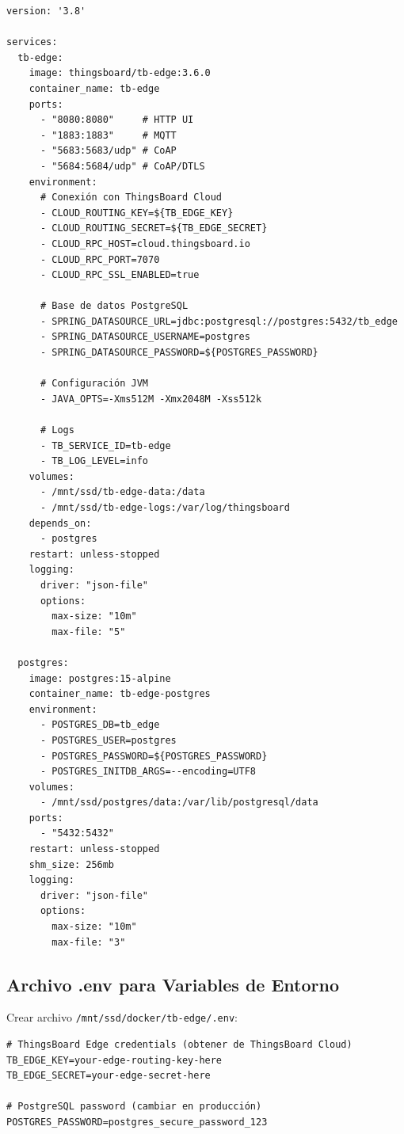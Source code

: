 \begin{verbatim}
version: '3.8'

services:
  tb-edge:
    image: thingsboard/tb-edge:3.6.0
    container_name: tb-edge
    ports:
      - "8080:8080"     # HTTP UI
      - "1883:1883"     # MQTT
      - "5683:5683/udp" # CoAP
      - "5684:5684/udp" # CoAP/DTLS
    environment:
      # Conexión con ThingsBoard Cloud
      - CLOUD_ROUTING_KEY=${TB_EDGE_KEY}
      - CLOUD_ROUTING_SECRET=${TB_EDGE_SECRET}
      - CLOUD_RPC_HOST=cloud.thingsboard.io
      - CLOUD_RPC_PORT=7070
      - CLOUD_RPC_SSL_ENABLED=true
      
      # Base de datos PostgreSQL
      - SPRING_DATASOURCE_URL=jdbc:postgresql://postgres:5432/tb_edge
      - SPRING_DATASOURCE_USERNAME=postgres
      - SPRING_DATASOURCE_PASSWORD=${POSTGRES_PASSWORD}
      
      # Configuración JVM
      - JAVA_OPTS=-Xms512M -Xmx2048M -Xss512k
      
      # Logs
      - TB_SERVICE_ID=tb-edge
      - TB_LOG_LEVEL=info
    volumes:
      - /mnt/ssd/tb-edge-data:/data
      - /mnt/ssd/tb-edge-logs:/var/log/thingsboard
    depends_on:
      - postgres
    restart: unless-stopped
    logging:
      driver: "json-file"
      options:
        max-size: "10m"
        max-file: "5"

  postgres:
    image: postgres:15-alpine
    container_name: tb-edge-postgres
    environment:
      - POSTGRES_DB=tb_edge
      - POSTGRES_USER=postgres
      - POSTGRES_PASSWORD=${POSTGRES_PASSWORD}
      - POSTGRES_INITDB_ARGS=--encoding=UTF8
    volumes:
      - /mnt/ssd/postgres/data:/var/lib/postgresql/data
    ports:
      - "5432:5432"
    restart: unless-stopped
    shm_size: 256mb
    logging:
      driver: "json-file"
      options:
        max-size: "10m"
        max-file: "3"
\end{verbatim}

\subsection{Archivo .env para Variables de Entorno}

Crear archivo \texttt{/mnt/ssd/docker/tb-edge/.env}:

\begin{verbatim}
# ThingsBoard Edge credentials (obtener de ThingsBoard Cloud)
TB_EDGE_KEY=your-edge-routing-key-here
TB_EDGE_SECRET=your-edge-secret-here

# PostgreSQL password (cambiar en producción)
POSTGRES_PASSWORD=postgres_secure_password_123
\end{verbatim}


